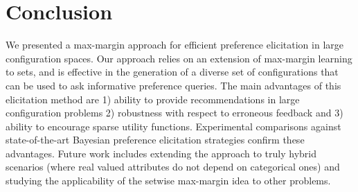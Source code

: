 \documentclass{article}
\renewcommand\[{\begin{equation}}
\renewcommand\]{\end{equation}}
\newcommand{\paolo}[1]{{\bf \textcolor{red}{{\fbox{Paolo:} #1}}}}
\begin{document}


\section{Conclusion}
\label{sec:conclusions}

We presented a max-margin approach for efficient preference
elicitation in large configuration spaces. Our approach relies on an
extension of max-margin learning to sets, and is effective in the
generation of a diverse set of configurations that can be used to ask
informative preference queries.  The main advantages of this
elicitation method are 1) ability to provide recommendations in large
configuration problems 2) robustness with respect to erroneous
feedback and 3) ability to encourage sparse utility functions.
Experimental comparisons against state-of-the-art Bayesian preference
elicitation strategies confirm these advantages. Future work includes
extending the approach to truly hybrid scenarios (where real valued
attributes do not depend on categorical ones) and studying the
applicability of the setwise max-margin idea to other problems.







\end{document}
